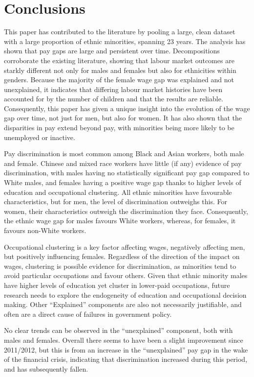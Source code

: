 \documentclass[class=article, crop=false]{standalone}
\begin{document}
\section{Conclusions}
\label{sec:Conclusions}
This paper has contributed to the literature by pooling a large, clean dataset with a large proportion of ethnic minorities, spanning 23 years. The analysis has shown that pay gaps are large and persistent over time. Decompositions corroborate the existing literature, showing that labour market outcomes are starkly different not only for males and females but also for ethnicities within genders. Because the majority of the female wage gap was explained and not unexplained, it indicates that differing labour market histories have been accounted for by the number of children and that the results are reliable. Consequently, this paper has given a unique insight into the evolution of the wage gap over time, not just for men, but also for women. It has also shown that the disparities in pay extend beyond pay, with minorities being more likely to be unemployed or inactive.

Pay discrimination is most common among Black and Asian workers, both male and female. Chinese and mixed race workers have little (if any) evidence of pay discrimination, with males having no statistically significant pay gap compared to White males, and females having a positive wage gap thanks to higher levels of education and occupational clustering. All ethnic minorities have favourable characteristics, but for men, the level of discrimination outweighs this. For women, their characteristics outweigh the discrimination they face. Consequently, the ethnic wage gap for males favours White workers, whereas, for females, it favours non-White workers.

Occupational clustering is a key factor affecting wages, negatively affecting men, but positively influencing females. Regardless of the direction of the impact on wages, clustering is possible evidence for discrimination, as minorities tend to avoid particular occupations and favour others. Given that ethnic minority males have higher levels of education yet cluster in lower-paid occupations, future research needs to explore the endogeneity of education and occupational decision making. Other \enquote{Explained} components are also not necessarily justifiable, and often are a direct cause of failures in government policy.

No clear trends can be observed in the \enquote{unexplained} component, both with males and females. Overall there seems to have been a slight improvement since 2011/2012, but this is from an increase in the \enquote{unexplained} pay gap in the wake of the financial crisis, indicating that discrimination increased during this period, and has subsequently fallen.
\end{document}
